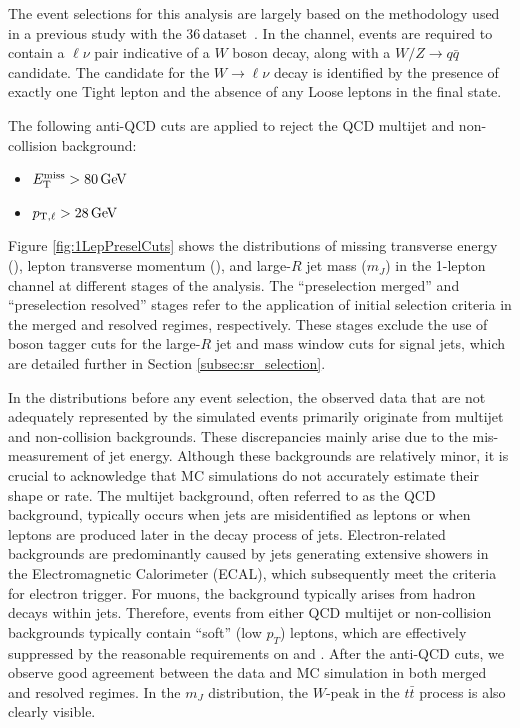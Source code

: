 \label{subsec:leptons_selection}

\label{subsubsec:1lep_event_selection}

The event selections for this analysis are largely based on the methodology used in a previous study with the 36\,\ifb dataset~\cite{Ryzhov:2310214}.
In the \olep channel, events are required to contain a $\ell\nu$ pair indicative of a $W$ boson decay, along with a $W/Z \to q\bar{q}$ candidate. The candidate for the $W \to \ell\nu$ decay is identified by the presence of exactly one Tight lepton and the absence of any Loose leptons in the final state.

The following anti-QCD cuts are applied to reject the QCD multijet and non-collision background:
\begin{itemize}
\item $E_{\text{T}}^{\text{miss}} > 80 \,\text{Ge\kern -0.1em V}$
\item $p_{{\textrm T},\ell} > 28 \,\text{Ge\kern -0.1em V}$ 
\end{itemize}

Figure \ref{fig:1LepPreselCuts} shows the distributions of missing transverse energy (\met), lepton transverse momentum (\ptl), and large-$R$ jet mass ($m_{J}$) in the 1-lepton channel at different stages of the analysis. The ``preselection merged'' and ``preselection resolved'' stages refer to the application of initial selection criteria in the merged and resolved regimes, respectively. These stages exclude the use of boson tagger cuts for the large-$R$ jet and mass window cuts for signal jets, which are detailed further in Section \ref{subsec:sr_selection}.

In the distributions before any event selection, the observed data that are not adequately represented by the simulated events primarily originate from multijet and non-collision backgrounds. These discrepancies mainly arise due to the mis-measurement of jet energy. Although these backgrounds are relatively minor, it is crucial to acknowledge that MC simulations do not accurately estimate their shape or rate. The multijet background, often referred to as the QCD background, typically occurs when jets are misidentified as leptons or when leptons are produced later in the decay process of jets.
Electron-related backgrounds are predominantly caused by jets generating extensive showers in the Electromagnetic Calorimeter (ECAL), which subsequently meet the criteria for electron trigger. For muons, the background typically arises from hadron decays within jets.
Therefore, events from either QCD multijet or non-collision backgrounds typically contain ``soft'' (low \( p_{T} \)) leptons, which are effectively suppressed by the reasonable requirements on \met and \ptl.
After the anti-QCD cuts, we observe good agreement between the data and MC simulation in both merged and resolved regimes. In the $m_{J}$ distribution, the $W$-peak in the $t\bar{t}$ process is also clearly visible.


